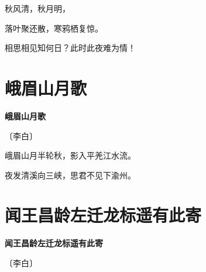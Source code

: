 \documentclass[12pt,UTF-8,openany,fontset=none]{ctexbook}
\begin{document}
\begin{center}
    \begin{Large}

        秋风清，秋月明，

        落叶聚还散，寒鸦栖复惊。

        相思相见知何日？此时此夜难为情！

    \end{Large}

\end{center}

\vspace{8pt}
\clearpage

\section{峨眉山月歌}


\begin{center}
    {\bfseries 峨眉山月歌}

    \vspace{18pt}

    \begin{large}\xuwen
        〔李白〕
    \end{large}

\end{center}

    \vspace{18pt}  %

\begin{center}
    \begin{Large}

        峨眉山月半轮秋，影入平羌江水流。

        夜发清溪向三峡，思君不见下渝州。

    \end{Large}

\end{center}

\vspace{8pt}
\clearpage

\section{闻王昌龄左迁龙标遥有此寄}


\begin{center}
    {\bfseries 闻王昌龄左迁龙标遥有此寄}

    \vspace{18pt}

    \begin{large}\xuwen
        〔李白〕
    \end{large}

\end{center}
\end{document}
